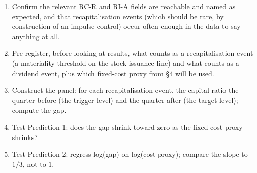 \documentclass[11pt]{article}
\begin{document}
\begin{enumerate}
\item Confirm the relevant RC-R and RI-A fields are reachable and named
  as expected, and that recapitalisation events (which should be rare, by
  construction of an impulse control) occur often enough in the data to
  say anything at all.
\item Pre-register, before looking at results, what counts as a
  recapitalisation event (a materiality threshold on the stock-issuance
  line) and what counts as a dividend event, plus which fixed-cost proxy
  from \S4 will be used.
\item Construct the panel: for each recapitalisation event, the capital
  ratio the quarter before (the trigger level) and the quarter after (the
  target level); compute the gap.
\item Test Prediction 1: does the gap shrink toward zero as the fixed-cost
  proxy shrinks?
\item Test Prediction 2: regress log(gap) on log(cost proxy); compare the
  slope to $1/3$, not to $1$.
\end{enumerate}



\end{document}
